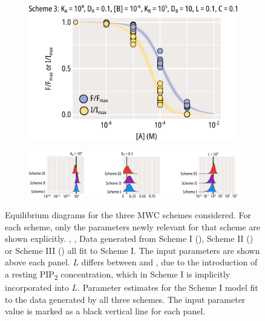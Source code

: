 \begin{figure}[h]
\begin{subfigure}[t]{0.3\textwidth}
	\end{subfigure}
	\hfill
	\begin{subfigure}[t]{0.3\textwidth}
		\caption{}\label{chxfig:mwc_scheme_3_fits}
		\centering
		\includegraphics[width=\textwidth]{mwc_scheme_3_fits.pdf}
	\end{subfigure}
	\vfill
	\begin{subfigure}[t]{0.9\textwidth}
		\caption{}\label{chxfig:mwc_params_1}
		\centering
		\includegraphics[width=\textwidth]{mwc_scheme_param_fits.pdf}
	\end{subfigure}
	\caption[Generating data from MWC model schemes]{
	 Equilibrium diagrams for the three MWC schemes considered.
	For each scheme, only the parameters newly relevant for that scheme are shown explicitly.
	, ,  Data generated from Scheme I (), Scheme II () or Scheme III () all fit to Scheme I.
	The input parameters are shown above each panel.
	$L$ differs between  and ,  due to the introduction of a resting PIP\textsubscript{2} concentration, which in Scheme I is implicitly incorporated into $L$.
	 Parameter estimates for the Scheme I model fit to the data generated by all three schemes.
	The input parameter value is marked as a black vertical line for each panel.
	}\label{chxfig:mwc_models}
\end{figure}


